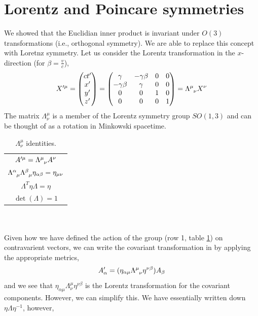 \documentclass{book}
\begin{document}
\section{Lorentz and Poincare symmetries}
We showed that the Euclidian inner product is invariant under $O(3)$ transformations (i.e., orthogonal symmetry). We are able to replace this concept with Loretnz symmetry. Let us consider the Lorentz transformation in the $x$-direction (for $\beta = \frac{v}{c}$),
\begin{equation}
	X'^{\mu} = \begin{pmatrix}ct' \\ x' \\ y' \\ z'\end{pmatrix} = \begin{pmatrix}
		\gamma & -\gamma\beta & 0 & 0 \\
		-\gamma\beta & \gamma & 0 & 0 \\
		0 & 0 & 1 & 0 \\
		0 & 0 & 0 & 1
	\end{pmatrix} = \Lambda\indices{^{\mu}_{\nu}}X^{\nu} \label{lorentztrans}
\end{equation}
The matrix $\Lambda^{\mu}_{\nu}$ is a member of the Lorentz symmetry group $SO(1,3)$ and can be thought of as a rotation in Minkowski spacetime.
\begin{table}
	\centering
	\caption{$\Lambda^{\mu}_{\nu}$ identities.}
	\begin{tabular}{c}
		\toprule
		$A'^{\mu} = \Lambda\indices{^{\mu}_{\nu}}A^{\nu}$ \\
		$\Lambda\indices{^{\alpha}_{\mu}}\Lambda\indices{^{\beta}_{\mu}}\eta_{\alpha\beta} = \eta_{\mu\nu}$ \\
		$\Lambda^T\eta\Lambda = \eta$ \\
		$\det(\Lambda)=1$ \\
		\bottomrule
	\end{tabular}
	\label{lambdaid}
\end{table}
\\\\
Given how we have defined the action of the group (row 1, table \ref{lambdaid}) on contravarient vectors, we can write the covariant transformation in by applying the appropriate metrics,
\begin{equation}
	A_{\alpha}' = (\eta_{\alpha\mu}\Lambda\indices{^{\mu}_{\nu}}\eta^{\nu\beta})A_{\beta} \label{covariant trans}
\end{equation}
and we see that $\eta_{\alpha\mu}\Lambda^{\mu}_{\nu}\eta^{\nu\beta}$ is the Lorentz transformation for the covariant components. However, we can simplify this. We have essentially written down $\eta\Lambda\eta^{-1}$, however,
\end{document}
